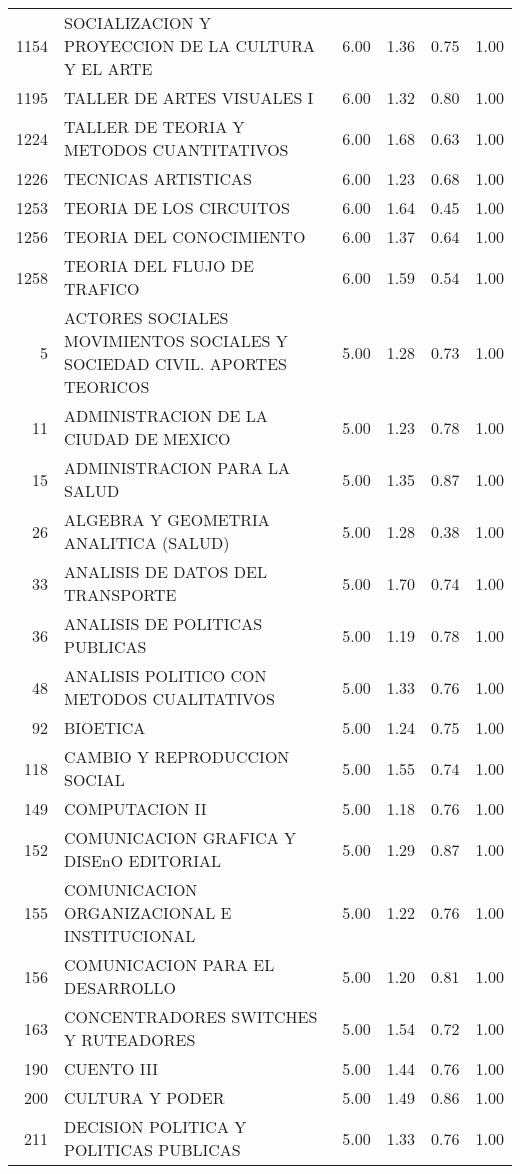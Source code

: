 \begin{table}[ht]
\begin{tabular}{rlrrrr}
  1154 & SOCIALIZACION Y PROYECCION DE LA CULTURA Y EL ARTE & 6.00 & 1.36 & 0.75 & 1.00 \\ 
  1195 & TALLER DE ARTES VISUALES I & 6.00 & 1.32 & 0.80 & 1.00 \\ 
  1224 & TALLER DE TEORIA Y METODOS CUANTITATIVOS & 6.00 & 1.68 & 0.63 & 1.00 \\ 
  1226 & TECNICAS ARTISTICAS & 6.00 & 1.23 & 0.68 & 1.00 \\ 
  1253 & TEORIA DE LOS CIRCUITOS & 6.00 & 1.64 & 0.45 & 1.00 \\ 
  1256 & TEORIA DEL CONOCIMIENTO & 6.00 & 1.37 & 0.64 & 1.00 \\ 
  1258 & TEORIA DEL FLUJO DE TRAFICO & 6.00 & 1.59 & 0.54 & 1.00 \\ 
  5 & ACTORES SOCIALES MOVIMIENTOS SOCIALES Y SOCIEDAD CIVIL. APORTES TEORICOS & 5.00 & 1.28 & 0.73 & 1.00 \\ 
  11 & ADMINISTRACION DE LA CIUDAD DE MEXICO & 5.00 & 1.23 & 0.78 & 1.00 \\ 
  15 & ADMINISTRACION PARA LA SALUD & 5.00 & 1.35 & 0.87 & 1.00 \\ 
  26 & ALGEBRA Y GEOMETRIA ANALITICA (SALUD) & 5.00 & 1.28 & 0.38 & 1.00 \\ 
  33 & ANALISIS DE DATOS DEL TRANSPORTE & 5.00 & 1.70 & 0.74 & 1.00 \\ 
  36 & ANALISIS DE POLITICAS PUBLICAS & 5.00 & 1.19 & 0.78 & 1.00 \\ 
  48 & ANALISIS POLITICO CON METODOS CUALITATIVOS & 5.00 & 1.33 & 0.76 & 1.00 \\ 
  92 & BIOETICA & 5.00 & 1.24 & 0.75 & 1.00 \\ 
  118 & CAMBIO Y REPRODUCCION SOCIAL & 5.00 & 1.55 & 0.74 & 1.00 \\ 
  149 & COMPUTACION II & 5.00 & 1.18 & 0.76 & 1.00 \\ 
  152 & COMUNICACION GRAFICA Y DISEnO EDITORIAL & 5.00 & 1.29 & 0.87 & 1.00 \\ 
  155 & COMUNICACION ORGANIZACIONAL E INSTITUCIONAL & 5.00 & 1.22 & 0.76 & 1.00 \\ 
  156 & COMUNICACION PARA EL DESARROLLO & 5.00 & 1.20 & 0.81 & 1.00 \\ 
  163 & CONCENTRADORES SWITCHES Y RUTEADORES & 5.00 & 1.54 & 0.72 & 1.00 \\ 
  190 & CUENTO III & 5.00 & 1.44 & 0.76 & 1.00 \\ 
  200 & CULTURA Y PODER & 5.00 & 1.49 & 0.86 & 1.00 \\ 
  211 & DECISION POLITICA Y POLITICAS PUBLICAS & 5.00 & 1.33 & 0.76 & 1.00 \\ 

\end{tabular}
\end{table}
